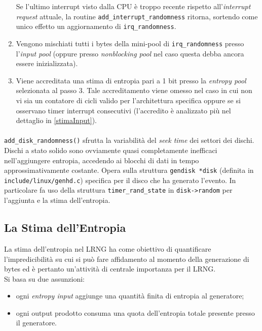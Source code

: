 \documentclass{article}
\begin{document}
\begin{enumerate}
   Se l'ultimo interrupt visto dalla
   CPU è troppo recente rispetto all'\emph{interrupt request} attuale, la
   routine \verb+add_interrupt_randomness+ ritorna, sortendo come unico effetto
   un aggiornamento di \verb+irq_randomness+.
   \item Vengono mischiati tutti i bytes della mini-pool di
   \verb+irq_randomness+ presso l'\emph{input pool} (oppure
   presso \emph{nonblocking pool} nel caso questa debba ancora essere
   inizializzata).
   \item Viene accreditata una stima di entropia pari a 1 bit presso la
   \emph{entropy pool} selezionata al passo 3. Tale accreditamento viene omesso
   nel caso in cui non vi sia un contatore di cicli valido per l'architettura
   specifica oppure se si osservano timer interrupt consecutivi (l'accredito è
   analizzato più nel dettaglio in \ref{stimaInput}).
 \end{enumerate} 

 
 \paragraph{} \verb+add_disk_randomness()+ sfrutta la variabilità del 
 \emph{seek time} dei settori dei dischi. Dischi a stato solido sono ovviamente
 quasi completamente inefficaci nell'aggiungere entropia, accedendo ai blocchi di 
 dati in tempo approssimativamente costante. \newline{}Opera sulla struttura 
 \verb+gendisk *disk+ (definita in \verb+include/linux/genhd.c+) specifica per
 il disco che ha generato l'evento.
 In particolare fa uso della struttura \verb+timer_rand_state+ in
 \verb+disk->random+ per l'aggiunta e la stima dell'entropia.
 
 \subsection{La Stima dell'Entropia}\label{stima}
La stima dell'entropia nel LRNG ha come obiettivo di quantificare
l'impredicibilità su cui si può fare affidamento al momento della generazione
di bytes ed è pertanto un'attività di centrale importanza per il LRNG. \\
Si basa su due assunzioni: 
\begin{itemize}
  \item ogni \emph{entropy input} aggiunge una quantità finita di entropia al
  generatore;
  \item ogni output prodotto consuma una quota dell'entropia totale presente
  presso il generatore.
\end{itemize}  
\end{document}
